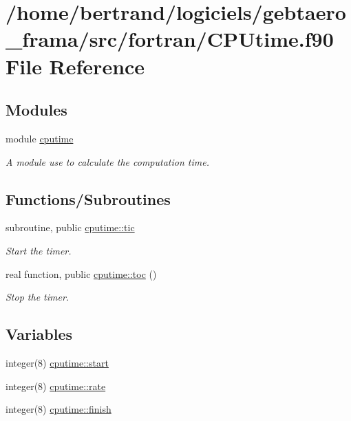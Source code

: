 \hypertarget{_c_p_utime_8f90}{}\section{/home/bertrand/logiciels/gebtaero\+\_\+frama/src/fortran/\+C\+P\+Utime.f90 File Reference}
\label{_c_p_utime_8f90}
\subsection*{Modules}
\begin{DoxyCompactItemize}
\item 
module \hyperlink{namespacecputime}{cputime}
\begin{DoxyCompactList}\small\item\em A module use to calculate the computation time. \end{DoxyCompactList}\end{DoxyCompactItemize}
\subsection*{Functions/\+Subroutines}
\begin{DoxyCompactItemize}
\item 
subroutine, public \hyperlink{namespacecputime_a8ddcbcba17e66ece6b29c63b69753684}{cputime\+::tic}
\begin{DoxyCompactList}\small\item\em Start the timer. \end{DoxyCompactList}\item 
real function, public \hyperlink{namespacecputime_a6c69d406a4397d16ea918e4eb035fde9}{cputime\+::toc} ()
\begin{DoxyCompactList}\small\item\em Stop the timer. \end{DoxyCompactList}\end{DoxyCompactItemize}
\subsection*{Variables}
\begin{DoxyCompactItemize}
\item 
integer(8) \hyperlink{namespacecputime_a3c944d7fc4487f41daf6348bf28b1598}{cputime\+::start}
\item 
integer(8) \hyperlink{namespacecputime_a7648112eab2c70c19434f100a9599633}{cputime\+::rate}
\item 
integer(8) \hyperlink{namespacecputime_ad2d439f12d6051a89b5ba23d52aa3e4f}{cputime\+::finish}
\end{DoxyCompactItemize}
